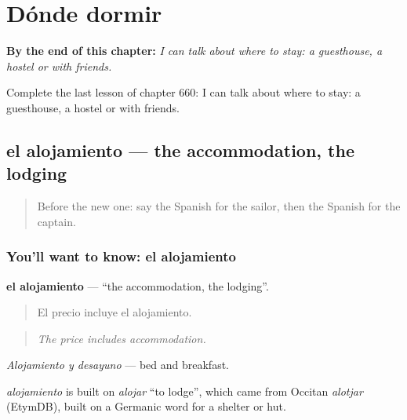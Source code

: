 
\chapter{Dónde dormir}
\label{ch:es-donde-dormir}

\begin{chapteropening}
\textbf{By the end of this chapter:} \emph{I can talk about where to stay: a guesthouse, a hostel or with friends.}

Complete the last lesson of chapter 660: I can talk about where to stay: a guesthouse, a hostel or with friends.
\end{chapteropening}

\section[el alojamiento]{el alojamiento — the accommodation, the lodging}

\label{lesson:ES-C660-alojamiento}



\begin{quote}
Before the new one: say the Spanish for the sailor, then the Spanish for the captain.
\end{quote}

\subsection*{You'll want to know: el alojamiento}
\textbf{el alojamiento} — \textquotedblleft{}the accommodation, the lodging\textquotedblright{}.

\begin{quote}
El precio incluye el alojamiento.
\end{quote}

\begin{quote}
\emph{The price includes accommodation.}
\end{quote}

\emph{Alojamiento y desayuno} — bed and breakfast.

\begin{cousinweb}
\emph{alojamiento} is built on \emph{alojar} \textquotedblleft{}to lodge\textquotedblright{}, which came from Occitan \emph{alotjar} (EtymDB), built on a Germanic word for a shelter or hut.
\end{cousinweb}

